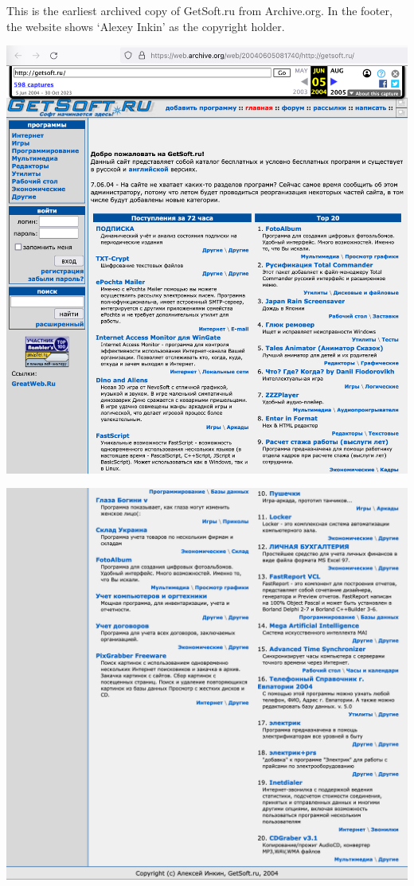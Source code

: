 
This is the earliest archived copy of GetSoft.ru from Archive.org.
In the footer, the website shows `Alexey Inkin' as the copyright holder.



\begin{center}
    \includegraphics[width=\textwidth]{getsoft-p1}
\end{center}
\WillContinue
\pagebreak

\Continuing
\begin{center}
    \includegraphics[width=\textwidth]{getsoft-p2}
\end{center}

\pagebreak
